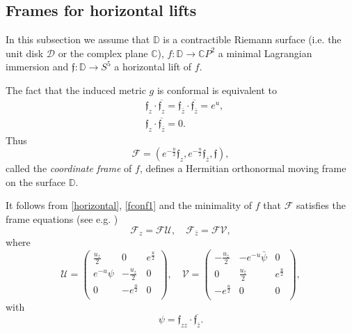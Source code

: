 \documentclass[a4paper,11pt]{amsart}
\theoremstyle{definition}
\numberwithin{equation}{section}
\newcommand{\C}{\mathbb{C}}
\newcommand{\D}{\mathbb{D}}
\newcommand{\f}{\mathfrak{f}}
\begin{document}
\subsection{Frames for horizontal lifts}\label{subsec:frames}
In this subsection we assume that $\D$ is a contractible Riemann surface   (i.e. the unit disk $\mathcal{D}$ or the complex plane $\mathbb{C}$), $f: \D \rightarrow \C P^2$ a minimal Lagrangian immersion and $\f : \D  \rightarrow S^5$ a horizontal lift of $f$.


The fact that the induced metric $g$ is conformal is equivalent to
\begin{equation}\label{fconf1} 
\begin{split}
&{\f}_z\cdot \overline{\f_z}=\f_{\bar z}\cdot \overline{\f_{\bar z}}=e^{u},\\
& \f_z\cdot \overline{\f_{\bar z}}=0.
\end{split}
\end{equation}
Thus 
\begin{equation} \label{coordframe}
\mathcal{F}=(e^{-\frac{u}{2}}\f_z, e^{-\frac{u}{2}}\f_{\bar z}, \f),
\end{equation}
called the {\it coordinate frame }of $f$,  defines a Hermitian orthonormal moving frame on the surface $\D$.


It follows from \eqref{horizontal}, \eqref{fconf1} and the minimality of
 $f$ that $\mathcal{F}$ satisfies the frame equations (see e.g. \cite{MM})
\begin{equation}\label{eq:frame1}
\mathcal{F}_{z}=\mathcal{F} {\mathcal U}, \quad \mathcal{F}_{\bar z}=\mathcal{F} {\mathcal V},
\end{equation}
where
\begin{equation}\label{eq:UV1}
{\mathcal U}=\left(\begin{array}{ccc}
                   \frac{u_z}{2} & 0 & e^{\frac{u}{2}} \\
      e^{-u}\psi  &-\frac{u_z}{2}  & 0 \\
       0 & -e^{\frac{u}{2}}  &0 \\
     \end{array}
   \right),
   \quad
{\mathcal V}=\left(
     \begin{array}{ccc}
      -\frac{u_{\bar z}}{2}  &  - e^{-u}\bar\psi  &0 \\
       0& \frac{u_{\bar z}}{2} &e^{\frac{u}{2}} \\
       -e^{\frac{u}{2}}  &0 &0 \\
     \end{array}
   \right),
\end{equation}
with
\begin{equation}\label{eq:phipsi}
\psi=\f_{zz}\cdot\overline{\f_{\bar z}}.
\end{equation}
\end{document}
